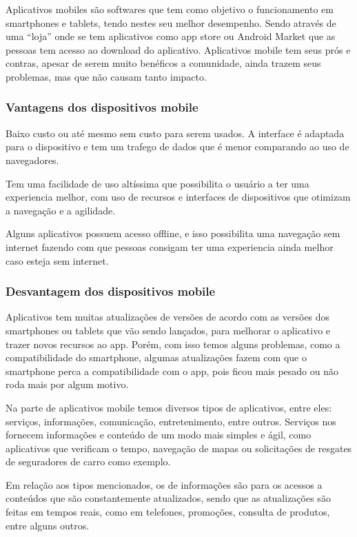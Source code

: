 Aplicativos mobiles são softwares que tem como objetivo o funcionamento em smartphones e tablets, tendo nestes seu melhor desempenho. Sendo através de uma “loja” onde se tem aplicativos como app store ou Android Market que as pessoas tem acesso ao download do aplicativo.
Aplicativos mobile tem seus prós e contras, apesar de serem muito benéficos a comunidade, ainda trazem seus problemas, mas que não causam tanto impacto.

\subsubsection{Vantagens dos dispositivos mobile}
Baixo custo ou até mesmo sem custo para serem usados. A interface é adaptada para o dispositivo e tem um trafego de dados que é menor comparando ao uso de navegadores.

Tem uma facilidade de uso altíssima que possibilita o usuário a ter uma experiencia melhor, com uso de recursos e interfaces de dispositivos que otimizam a navegação e a agilidade.

Alguns aplicativos possuem acesso offline, e isso possibilita uma navegação sem internet fazendo com que pessoas consigam ter uma experiencia ainda melhor caso esteja sem internet.

\subsubsection{Desvantagem dos dispositivos mobile}
Aplicativos tem muitas atualizações de versões de acordo com as versões dos smartphones ou tablets que vão sendo lançados, para melhorar o aplicativo e trazer novos recursos ao app. Porém, com isso temos alguns problemas, como a compatibilidade do smartphone, algumas atualizações fazem com que o smartphone perca a compatibilidade com o app, pois ficou mais pesado ou não roda mais por algum motivo.

Na parte de aplicativos mobile temos diversos tipos de aplicativos, entre eles: serviços, informações, comunicação, entretenimento, entre outros. Serviços nos fornecem informações e conteúdo de um modo mais simples e ágil, como aplicativos que verificam o tempo, navegação de mapas ou solicitações de resgates de seguradores de carro como exemplo.

Em relação aos tipos mencionados, os de informações são para os acessos a conteúdos que são constantemente atualizados, sendo que as atualizações são feitas em tempos reais, como em telefones, promoções, consulta de produtos, entre alguns outros.

